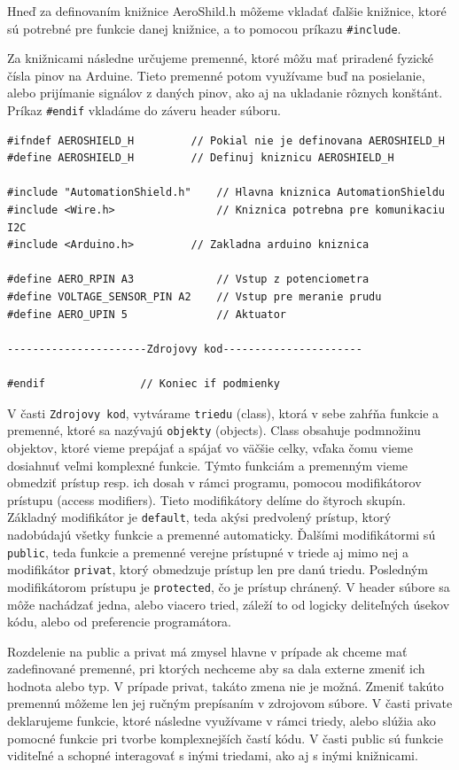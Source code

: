 Hneď za definovaním knižnice AeroShild.h môžeme vkladať ďalšie knižnice, ktoré sú potrebné pre funkcie danej knižnice, a to pomocou príkazu \verb|#include|.

Za knižnicami následne určujeme premenné, ktoré môžu mať priradené fyzické čísla pinov na Arduine. Tieto premenné potom využívame buď na posielanie, alebo prijímanie signálov z daných pinov, ako aj na ukladanie rôznych konštánt. Príkaz \verb|#endif| vkladáme do záveru header súboru.

\begin{lstlisting}[caption={Ukážka zdrojového kódu headeru.},captionpos=b]
#ifndef AEROSHIELD_H	 	 // Pokial nie je definovana AEROSHIELD_H
#define AEROSHIELD_H	 	 // Definuj kniznicu AEROSHIELD_H

#include "AutomationShield.h"    // Hlavna kniznica AutomationShieldu
#include <Wire.h>                // Kniznica potrebna pre komunikaciu I2C
#include <Arduino.h>		 // Zakladna arduino kniznica

#define AERO_RPIN A3             // Vstup z potenciometra
#define VOLTAGE_SENSOR_PIN A2    // Vstup pre meranie prudu 
#define AERO_UPIN 5              // Aktuator

----------------------Zdrojovy kod----------------------

#endif			   	 // Koniec if podmienky 
\end{lstlisting}



V časti \verb|Zdrojovy kod|, vytvárame \verb|triedu| (class), ktorá v sebe zahŕňa funkcie a premenné, ktoré sa nazývajú \verb|objekty| (objects). Class obsahuje podmnožinu objektov, ktoré vieme prepájať a spájať vo väčšie celky, vďaka čomu vieme dosiahnuť veľmi komplexné funkcie. Týmto funkciám a premenným vieme obmedziť prístup resp. ich dosah v rámci programu, pomocou modifikátorov prístupu (access modifiers). Tieto modifikátory delíme do štyroch skupín. Základný modifikátor je \verb|default|, teda akýsi predvolený prístup, ktorý nadobúdajú všetky funkcie a premenné automaticky. Ďalšími modifikátormi sú \verb|public|, teda funkcie a premenné verejne prístupné v triede aj mimo nej a modifikátor \verb|privat|, ktorý obmedzuje prístup len pre danú triedu. Posledným modifikátorom prístupu je \verb|protected|, čo je prístup chránený. V header súbore sa môže nachádzať jedna, alebo viacero tried, záleží to od logicky deliteľných úsekov kódu, alebo od preferencie programátora. 

Rozdelenie na public a privat má zmysel hlavne v prípade ak chceme mať zadefinované premenné, pri ktorých nechceme aby sa dala externe zmeniť ich hodnota alebo typ. V prípade privat, takáto zmena nie je možná. Zmeniť takúto premennú môžeme len jej ručným prepísaním v zdrojovom súbore. V časti private deklarujeme funkcie, ktoré následne využívame v rámci triedy, alebo slúžia ako pomocné funkcie pri tvorbe komplexnejších častí kódu. V časti public sú funkcie viditeľné a schopné interagovať s inými triedami, ako aj s inými knižnicami. 


